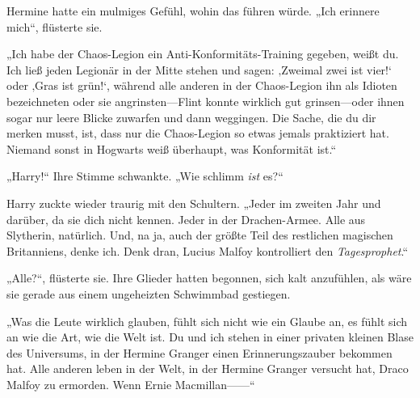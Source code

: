 Hermine hatte ein mulmiges Gefühl, wohin das führen würde. „Ich erinnere mich“, flüsterte sie.

„Ich habe der Chaos-Legion ein Anti-Konformitäts-Training gegeben, weißt du. Ich ließ jeden Legionär in der Mitte stehen und sagen: ‚Zweimal zwei ist vier!‘ oder ‚Gras ist grün!‘, während alle anderen in der Chaos-Legion ihn als Idioten bezeichneten oder sie angrinsten—Flint konnte wirklich gut grinsen—oder ihnen sogar nur leere Blicke zuwarfen und dann weggingen. Die Sache, die du dir merken musst, ist, dass nur die Chaos-Legion so etwas jemals praktiziert hat. Niemand sonst in Hogwarts weiß überhaupt, was Konformität ist.“

„Harry!“ Ihre Stimme schwankte. „Wie schlimm \emph{ist} es?“

Harry zuckte wieder traurig mit den Schultern. „Jeder im zweiten Jahr und darüber, da sie dich nicht kennen. Jeder in der Drachen-Armee. Alle aus Slytherin, natürlich. Und, na ja, auch der größte Teil des restlichen magischen Britanniens, denke ich. Denk dran, Lucius Malfoy kontrolliert den \emph{Tagesprophet}.“

„Alle?“, flüsterte sie. Ihre Glieder hatten begonnen, sich kalt anzufühlen, als wäre sie gerade aus einem ungeheizten Schwimmbad gestiegen.

„Was die Leute wirklich glauben, fühlt sich nicht wie ein Glaube an, es fühlt sich an wie die Art, wie die Welt ist. Du und ich stehen in einer privaten kleinen Blase des Universums, in der Hermine Granger einen Erinnerungszauber bekommen hat. Alle anderen leben in der Welt, in der Hermine Granger versucht hat, Draco Malfoy zu ermorden. Wenn Ernie Macmillan——“


